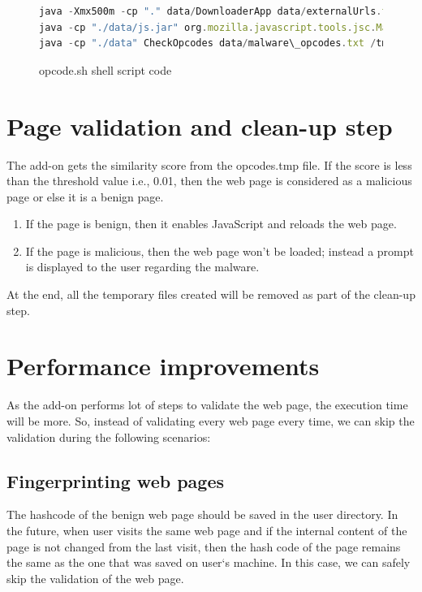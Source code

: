 \begin{figure}[h]
  \centering
\begin{lstlisting}[frame=single,language=JavaScript,mathescape=false]
java -Xmx500m -cp "." data/DownloaderApp data/externalUrls.txt
java -cp "./data/js.jar" org.mozilla.javascript.tools.jsc.Main /tmp/JSStatements.js > /tmp/opcodes.txt
java -cp "./data" CheckOpcodes data/malware\_opcodes.txt /tmp/opcodes.txt > $1
\end{lstlisting}
\caption[opcode.sh shell script code]{opcode.sh shell script code}
    \label{fig:shellscriptcode}
\end{figure}

\section{Page validation and clean-up step}

The add-on gets the similarity score from the opcodes.tmp file. If the score is less than the threshold value i.e., 0.01, then the web page is considered as a malicious page or else it is a benign page. 
\begin{enumerate}
\item If the page is benign, then it enables JavaScript and reloads the web page.
\item If the page is malicious, then the web page won't be loaded; instead a prompt is displayed to the user regarding the malware.
\end{enumerate}
At the end, all the temporary files created will be removed as part of the clean-up step.

\section{Performance improvements} 
As the add-on performs lot of steps to validate the web page, the execution time will be more. So, instead of validating every web page every time, we can skip the validation during the following scenarios: 
\subsection{Fingerprinting web pages} \label{fingerprintingwp}
The hashcode of the benign web page should be saved in the user directory. In the future, when user visits the same web page and if the internal content of the page is not changed from the last visit, then the hash code of the page remains the same as the one that was saved on user`s machine. In this case, we can safely skip the validation of the web page. 

